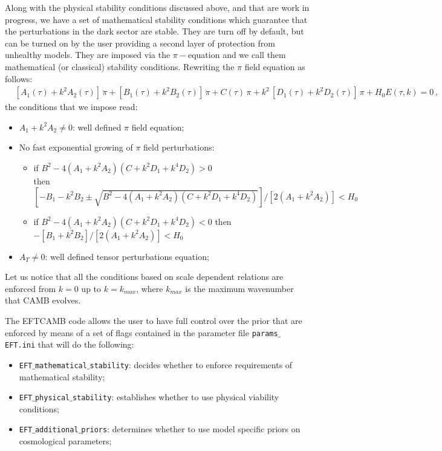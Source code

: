 \documentclass[prd,nofootinbib,showpacs]{revtex4}
\begin{document}
{Along with the physical stability conditions discussed above, and that are work in progress, we have a set of mathematical stability conditions which guarantee that the perturbations in the dark sector are stable. They are turn off by default, but can be turned on by the user providing a second layer of protection from unhealthy models. 
They are imposed via the $\pi-$equation and we call them mathematical (or classical) stability conditions. Rewriting the $\pi$ field equation as follows:
%
\begin{align}
& \left[A_1(\tau) + k^2 A_2(\tau)\right]\,\ddot{\pi} + \left[ B_1(\tau)+ k^2 B_2(\tau)\right]\,\dot{\pi} + C(\tau)\,\pi + k^2\,\left[D_1(\tau) + k^2D_2(\tau) \right]\,\pi + H_0 E(\tau,k) =0   \,,
\end{align}
%
the conditions that we impose read: 
%
\begin{itemize}
\item $A_1 + k^2 A_2 \neq 0$: well defined $\pi$ field equation;
\item No fast exponential growing of $\pi$ field perturbations:
\begin{itemize}
\item if $ B^2 -4(A_1+ k^2 A_2)( C +k^2D_1 + k^4D_2) > 0$ \\ 
then $ \left[ -B_1 - k^2 B_2 \pm \sqrt{B^2 -4(A_1+ k^2 A_2)( C +k^2D_1 + k^4D_2)} \right] / \left[ 2 (A_1 + k^2 A_2) \right] < H_0$
\item if $ B^2 -4(A_1+ k^2 A_2)( C +k^2D_1 + k^4D_2) < 0$ then $ - \left[ B_1 + k^2 B_2\right] / \left[ 2 (A_1 + k^2 A_2) \right] < H_0$  
\end{itemize}
\item $A_T \neq 0$: well defined tensor perturbations equation;
\end{itemize}
%

Let us notice that all the conditions based on scale dependent relations are enforced  from $k=0$ up to $k=k_{max}$, where $k_{max}$ is the maximum wavenumber that CAMB evolves.

The EFTCAMB code allows the user to have full control over the prior that are enforced by means of a set of flags contained in the parameter file \texttt{params$\_$EFT.ini} that will do the following:
%
\begin{itemize}
\item \texttt{EFT$\_$mathematical$\_$stability}: decides whether to enforce requirements of mathematical stability;
\item \texttt{EFT$\_$physical$\_$stability}: establishes whether to use physical viability conditions;
\item \texttt{EFT$\_$additional$\_$priors}: determines whether to use model specific priors on cosmological parameters;
\end{itemize}
%

}
\end{document}
